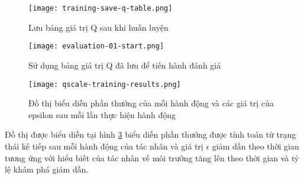 \begin{figure}[H]
    \centering
    \texttt{[image: training-save-q-table.png]}
    \caption{Lưu bảng giá trị Q sau khi huấn luyện}
    \label{fig:training-save}
\end{figure}

\begin{figure}[H]
    \centering
    \texttt{[image: evaluation-01-start.png]}
    \caption{Sử dụng bảng giá trị Q đã lưu để tiến hành đánh giá}
    \label{fig:evaluate-start}
\end{figure}

\begin{figure}[H]
    \centering
    \texttt{[image: qscale-training-results.png]}
    \caption{Đồ thị biểu diễn phần thưởng của mỗi hành động và các giá trị của epsilon sau mỗi lần thực hiện hành động}
    \label{fig:result-graph}
\end{figure}

Đồ thị được biểu diễn tại hình \ref{fig:result-graph} biểu diễn phần thưởng được tính toán từ trạng thái kế tiếp sau mỗi hành động của tác nhân và giá trị $\epsilon$ giảm dần theo thời gian tương ứng với hiểu biết của tác nhân về môi trường tăng lên theo thời gian và tỷ lệ khám phá giảm dần.